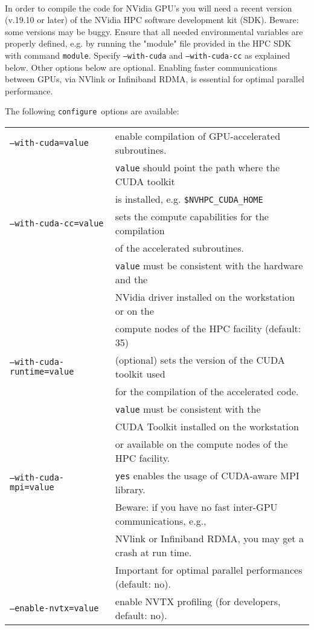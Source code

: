 \documentclass[12pt,a4paper]{article}
\def\configure{\texttt{configure}}
\begin{document}
\\
In order to compile the code for NVidia GPU's you will need a recent version
(v.19.10 or later) of the NVidia HPC software development kit (SDK). Beware:
some versions may be buggy. Ensure that all needed environmental variables
are properly defined, e.g. by running the "module" file provided in the HPC SDK with command
\texttt{module}. Specify \texttt{--with-cuda} and \texttt{--with-cuda-cc} as explained 
below. Other options below
are optional. Enabling faster communications between GPUs, via NVlink or Infiniband RDMA, 
is essential for optimal parallel performance. 

The following \configure\ options are available:\\
\begin{tabular}{ll}
\texttt{--with-cuda=value}&         enable compilation of GPU-accelerated subroutines.\\
                          &         \texttt{value} should point the path where the CUDA toolkit \\
                          &         is installed, e.g. \texttt{\$NVHPC\_CUDA\_HOME}\\
\texttt{--with-cuda-cc=value}&      sets the compute capabilities for the compilation\\
                             &      of the accelerated subroutines. \\
                             &      \texttt{value} must be consistent with the hardware and the\\
                             &      NVidia driver installed on the workstation or on the\\
                             &      compute nodes of the HPC facility (default: 35)\\
\texttt{--with-cuda-runtime=value}& (optional) sets the version of the CUDA toolkit used \\
                                  & for the compilation of the accelerated code.\\
                                  & \texttt{value} must be consistent with the\\
                                  & CUDA Toolkit installed on the workstation \\
                                  & or available on the compute nodes of the HPC facility.\\
\texttt{--with-cuda-mpi=value}    & \texttt{yes} enables the usage of CUDA-aware MPI library.\\
                                  & Beware: if you have no fast inter-GPU communications, e.g.,\\
				  & NVlink or Infiniband RDMA, you may get a crash at run time.\\
				  & Important for optimal parallel performances (default: no).\\
\texttt{--enable-nvtx=value}      & enable NVTX profiling (for developers, default: no).\\
\end{tabular}
\end{document}
